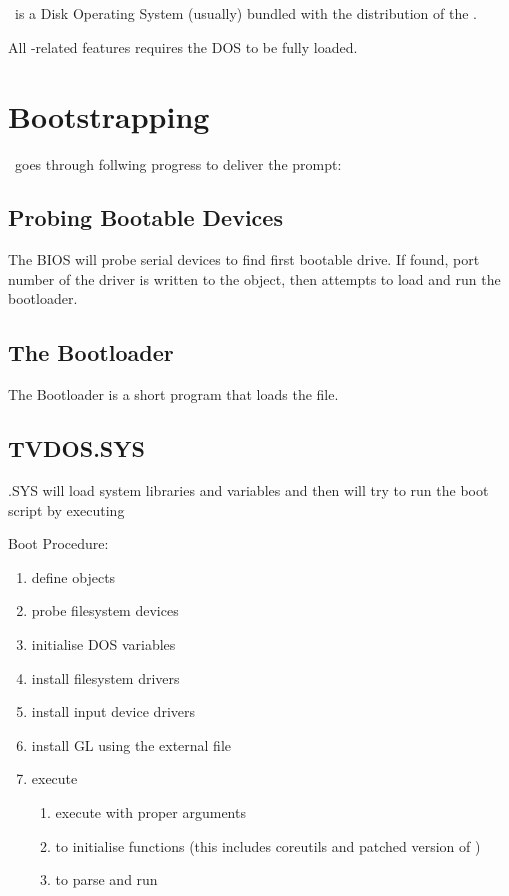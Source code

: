 \chapter{\thedos}

\thedos\ is a Disk Operating System (usually) bundled with the distribution of the \thismachine.

All \thedos-related features requires the DOS to be fully loaded.


\chapter{Bootstrapping}

\thedos\ goes through follwing progress to deliver the  prompt:

\section{Probing Bootable Devices}
The BIOS will probe serial devices to find first bootable drive. If found, port number of the driver is written to the  object, then attempts to load and run the bootloader.

\section{The Bootloader}
The Bootloader is a short program that loads the  file.

\section{TVDOS.SYS}
\thedos.SYS will load system libraries and variables and then will try to run the boot script by executing 

Boot Procedure:

\begin{enumerate}
 \item define  objects
 \item probe filesystem devices
 \item initialise DOS variables
 \item install filesystem drivers
 \item install input device drivers
 \item install GL using the external file
 \item execute 
 \begin{enumerate}
  \item execute  with proper arguments
  \item {} to initialise  functions (this includes coreutils and patched version of )
  \item {} to parse and run 
 \end{enumerate}
\end{enumerate}

